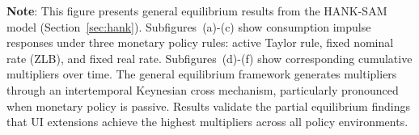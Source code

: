 \documentclass{econsocart}
\begin{document}
\noindent\parbox{\textwidth}{\footnotesize
  \textbf{Note}: This figure presents general equilibrium results from the HANK-SAM model (Section~\ref{sec:hank}).
  Subfigures~(a)-(c) show consumption impulse responses under three monetary policy rules:
  active Taylor rule, fixed nominal rate (ZLB), and fixed real rate.
  Subfigures~(d)-(f) show corresponding cumulative multipliers over time.
  The general equilibrium framework generates multipliers through an intertemporal Keynesian cross mechanism,
  particularly pronounced when monetary policy is passive.
  Results validate the partial equilibrium findings that UI extensions achieve the highest multipliers
  across all policy environments.
}

\vspace{1em}  %
\end{document}
